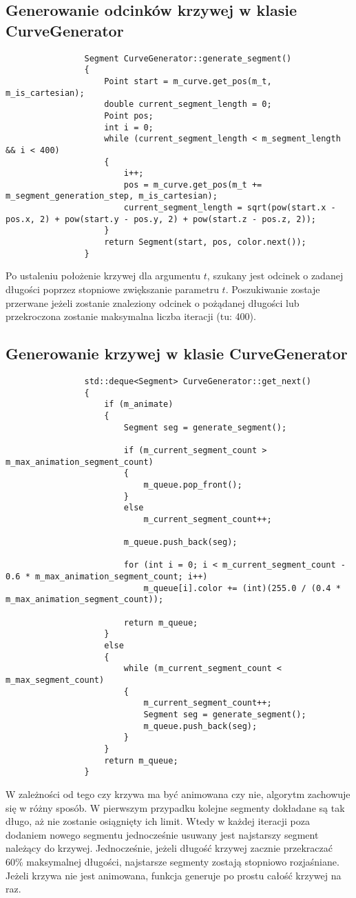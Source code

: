 		\subsection{Generowanie odcinków krzywej w klasie CurveGenerator}
			\begin{lstlisting}
				Segment CurveGenerator::generate_segment()
				{
					Point start = m_curve.get_pos(m_t, m_is_cartesian);
					double current_segment_length = 0;
					Point pos;
					int i = 0;
					while (current_segment_length < m_segment_length && i < 400)
					{
						i++;
						pos = m_curve.get_pos(m_t += m_segment_generation_step, m_is_cartesian);
						current_segment_length = sqrt(pow(start.x - pos.x, 2) + pow(start.y - pos.y, 2) + pow(start.z - pos.z, 2));
					}
					return Segment(start, pos, color.next());
				}
			\end{lstlisting}
			Po ustaleniu położenie krzywej dla argumentu $t$, szukany jest odcinek o zadanej długości poprzez stopniowe zwiększanie parametru $t$.
			Poszukiwanie zostaje przerwane jeżeli zostanie znaleziony odcinek o pożądanej długości lub przekroczona zostanie maksymalna liczba iteracji (tu: 400).
		\subsection{Generowanie krzywej w klasie CurveGenerator}
			\begin{lstlisting}
				std::deque<Segment> CurveGenerator::get_next()
				{
					if (m_animate)
					{
						Segment seg = generate_segment();
				
						if (m_current_segment_count > m_max_animation_segment_count)
						{
							m_queue.pop_front();
						}
						else
							m_current_segment_count++;
				
						m_queue.push_back(seg);
				
						for (int i = 0; i < m_current_segment_count - 0.6 * m_max_animation_segment_count; i++)
							m_queue[i].color += (int)(255.0 / (0.4 * m_max_animation_segment_count));
				
						return m_queue;
					}
					else
					{
						while (m_current_segment_count < m_max_segment_count)
						{
							m_current_segment_count++;
							Segment seg = generate_segment();
							m_queue.push_back(seg);
						}
					}
					return m_queue;
				}
			\end{lstlisting}
			W zależności od tego czy krzywa ma być animowana czy nie, algorytm zachowuje się w różny sposób.
			W pierwszym przypadku kolejne segmenty dokładane są tak długo, aż nie zostanie osiągnięty ich limit. Wtedy w każdej iteracji poza dodaniem nowego segmentu jednocześnie usuwany jest najstarszy segment należący do krzywej.
			Jednocześnie, jeżeli długość krzywej zacznie przekraczać 60\% maksymalnej długości, najstarsze segmenty zostają stopniowo rozjaśniane.
			Jeżeli krzywa nie jest animowana, funkcja generuje po prostu całość krzywej na raz.
			
